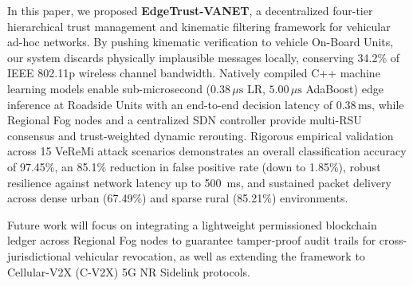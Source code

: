 \documentclass[conference]{IEEEtran}
\begin{document}
In this paper, we proposed \textbf{EdgeTrust-VANET}, a decentralized four-tier hierarchical trust management and kinematic filtering framework for vehicular ad-hoc networks. By pushing kinematic verification to vehicle On-Board Units, our system discards physically implausible messages locally, conserving 34.2\% of IEEE 802.11p wireless channel bandwidth. Natively compiled C++ machine learning models enable sub-microsecond ($0.38\,\mu\text{s}$ LR, $5.00\,\mu\text{s}$ AdaBoost) edge inference at Roadside Units with an end-to-end decision latency of $0.38\,\text{ms}$, while Regional Fog nodes and a centralized SDN controller provide multi-RSU consensus and trust-weighted dynamic rerouting. Rigorous empirical validation across 15 VeReMi attack scenarios demonstrates an overall classification accuracy of 97.45\%, an 85.1\% reduction in false positive rate (down to 1.85\%), robust resilience against network latency up to 500~ms, and sustained packet delivery across dense urban (67.49\%) and sparse rural (85.21\%) environments.

Future work will focus on integrating a lightweight permissioned blockchain ledger across Regional Fog nodes to guarantee tamper-proof audit trails for cross-jurisdictional vehicular revocation, as well as extending the framework to Cellular-V2X (C-V2X) 5G NR Sidelink protocols.

\balance

\end{document}
